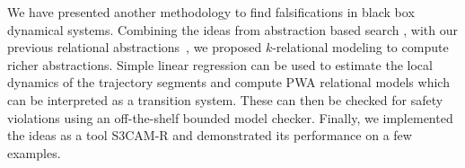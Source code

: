 
We have presented another methodology to find falsifications in black
box dynamical systems. Combining the ideas from abstraction based
search \cite{zutshi2014multiple}, with our previous relational
abstractions~\cite{zutshi2012timed}, we proposed $k$-relational
modeling to compute richer abstractions. Simple linear regression can
be used to estimate the local dynamics of the trajectory segments and
compute PWA relational models which can be interpreted as a transition
system.  These can then be checked for safety violations using an
off-the-shelf bounded model checker.  Finally, we implemented the
ideas as a tool S3CAM-R and demonstrated its performance on a few examples.






